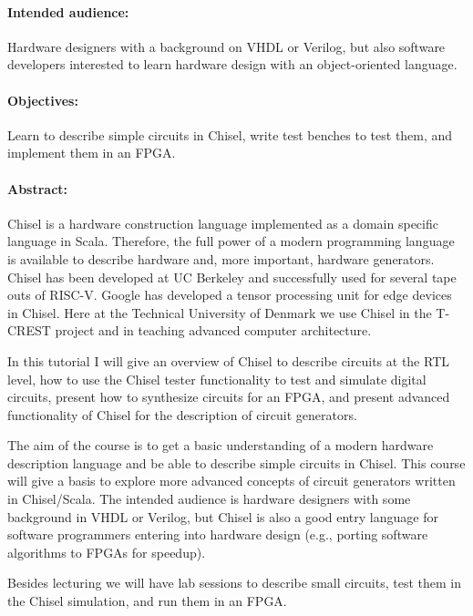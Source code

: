 \documentclass{article}
\begin{document}
\paragraph{Intended audience:}

Hardware designers with a background on VHDL or Verilog, but also software developers
interested to learn hardware design with an object-oriented language.
 
\paragraph{Objectives:}

Learn to describe simple circuits in Chisel, write test benches to test them, and implement them
in an FPGA.

\paragraph{Abstract:}

Chisel is a hardware construction language implemented as a domain specific language in Scala. Therefore, the full power of a modern programming language is available to describe hardware and, more important, hardware generators. Chisel has been developed at UC Berkeley and successfully used for several tape outs of RISC-V. Google has developed a tensor processing unit for edge devices in Chisel. Here at the Technical University of Denmark we use Chisel in the T-CREST project and in teaching advanced computer architecture.

In this tutorial I will give an overview of Chisel to describe circuits at the RTL level, how to use the Chisel tester functionality to test and simulate digital circuits, present how to synthesize circuits for an FPGA, and present advanced functionality of Chisel for the description of circuit generators.

The aim of the course is to get a basic understanding of a modern hardware description language and be able to describe simple circuits in Chisel. This course will give a basis to explore more advanced concepts of circuit generators written in Chisel/Scala. The intended audience is hardware designers with some background in VHDL or Verilog, but Chisel is also a good entry language for software programmers entering into hardware design
(e.g., porting software algorithms to FPGAs for speedup).

Besides lecturing we will have lab sessions to describe small circuits, test them in the Chisel simulation,
and run them in an FPGA.
\end{document}
